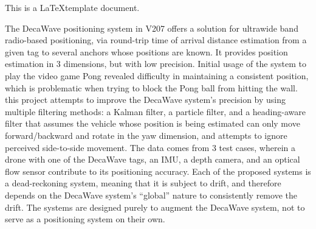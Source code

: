This is a \LaTeX template document.\cite{small}

The DecaWave positioning system in V207 offers a solution for ultrawide band radio-based positioning,
via round-trip time of arrival distance estimation from a given tag to several anchors whose positions
are known.
It provides position estimation in 3 dimensions, but with low precision.
Initial usage of the system to play the video game Pong revealed difficulty in maintaining a consistent
position, which is problematic when trying to block the Pong ball from hitting the wall.
this project attempts to improve the DecaWave system's precision by using
multiple filtering methods: a Kalman filter, a particle filter, and a heading-aware filter that
assumes the vehicle whose position is being estimated can only move forward/backward
and rotate in the yaw dimension,
and attempts to ignore perceived side-to-side movement.
The data comes from 3 test cases, wherein a drone with one of the DecaWave tags, an IMU, a depth camera,
and an optical flow sensor contribute to its positioning accuracy.
Each of the proposed systems is a dead-reckoning system, meaning that it is subject to drift,
and therefore depends on the DecaWave system's ``global'' nature to consistently remove the drift.
The systems are designed purely to augment the DecaWave system, not to serve as a positioning
system on their own.
